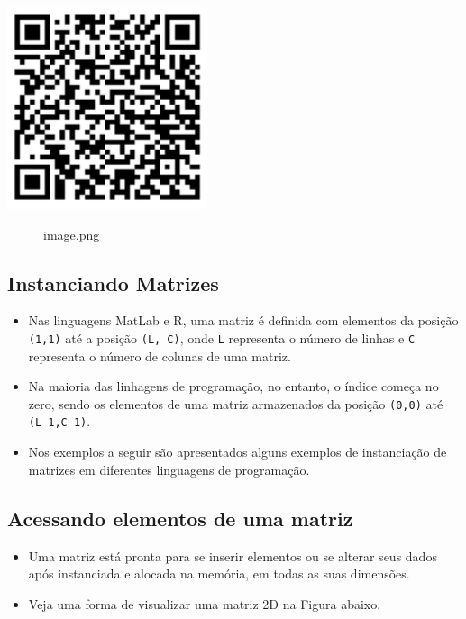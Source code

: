 \documentclass[12pt,a4paper]{article}
\providecommand{\tightlist}{%
      \setlength{\itemsep}{0pt}\setlength{\parskip}{0pt}}
\begin{document}
\includegraphics{"figs/image38.png"}

    \begin{figure}
\centering
\caption{image.png}
\end{figure}

    \hypertarget{instanciando-matrizes}{%
\subsection{Instanciando Matrizes}\label{instanciando-matrizes}}

    \begin{itemize}
\item
  Nas linguagens MatLab e R, uma matriz é definida com elementos da
  posição \texttt{(1,1)} até a posição \texttt{(L,\ C)}, onde \texttt{L}
  representa o número de linhas e \texttt{C} representa o número de
  colunas de uma matriz.
\item
  Na maioria das linhagens de programação, no entanto, o índice começa
  no zero, sendo os elementos de uma matriz armazenados da posição
  \texttt{(0,0)} até \texttt{(L-1,C-1)}.
\item
  Nos exemplos a seguir são apresentados alguns exemplos de instanciação
  de matrizes em diferentes linguagens de programação.
\end{itemize}

    \hypertarget{acessando-elementos-de-uma-matriz}{%
\subsection{Acessando elementos de uma
matriz}\label{acessando-elementos-de-uma-matriz}}

    \begin{itemize}
\tightlist
\item
  Uma matriz está pronta para se inserir elementos ou se alterar seus
  dados após instanciada e alocada na memória, em todas as suas
  dimensões.
\item
  Veja uma forma de visualizar uma matriz 2D na Figura abaixo.
\end{itemize}
\end{document}
